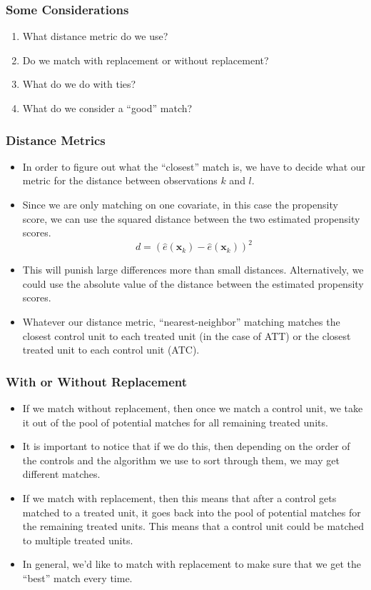 \documentclass{beamer}
\begin{document}
\begin{frame}[c]\frametitle{Some Considerations}
	\begin{enumerate}
		\item<+-> What distance metric do we use?
	\item<+-> Do we match with replacement or without replacement?
	\item<+-> What do we do with ties?
	\item<+-> What do we consider a ``good'' match?
	\end{enumerate}
\end{frame}

\begin{frame}[c]\frametitle{Distance Metrics}
	\begin{itemize}
		\item<+-> In order to figure out what the ``closest'' match is, we have to decide what our metric for the distance between observations $k$ and $l$. 
		\item<+-> Since we are only matching on one covariate, in this case the propensity score, we can use the squared distance between the two estimated propensity scores.
		\[ d = (\hat{e}(\mathbf{x}_k) - \hat{e}(\mathbf{x}_k))^2 \]
		\item<+-> This will punish large differences more than small distances.  Alternatively, we could use the absolute value of the distance between the estimated propensity scores. 
		\item<+->  Whatever our distance metric, ``nearest-neighbor'' matching matches the closest control unit to each treated unit (in the case of ATT) or the closest treated unit to each control unit (ATC).
	\end{itemize}
\end{frame}

\begin{frame}[c]\frametitle{With or Without Replacement}
	\begin{itemize}
		\item<+-> If we match without replacement, then once we match a control unit, we take it out of the pool of potential matches for all remaining treated units.
		\item<+-> It is important to notice that if we do this, then depending on the order of the controls and the algorithm we use to sort through them, we may get different matches.
		\item<+-> If we match with replacement, then this means that after a control gets matched to a treated unit, it goes back into the pool of potential matches for the remaining treated units.  This means that a control unit could be matched to multiple treated units.
		\item<+-> In general, we'd like to match with replacement to make sure that we get the ``best'' match every time.
	\end{itemize}	
\end{frame}
\end{document}
